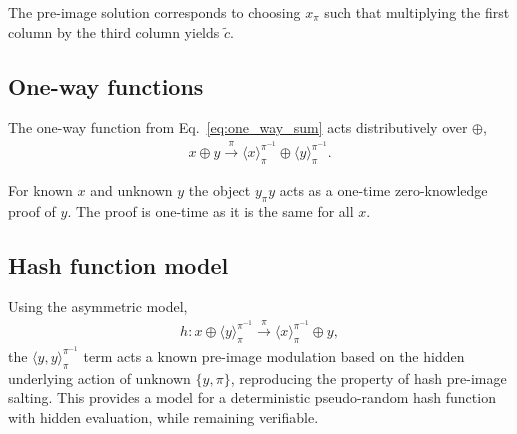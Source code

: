 \documentclass[twocolumn, aps, amsmath, amssymb, nofootinbib, superscriptaddress, longbibliography, doublefloatfix, table-of-contents, eqsecnum, rmp]{revtex4-2}
\def\braid#1#2#3#4{\langle#1,#2\rangle_{#3}^{#4}}
\def\selfbraid#1#2#3{\langle#1\rangle_{#2}^{#3}}
\def\comm#1#2#3#4{[#1,#2]_{#3}^{#4}}
\begin{document}
The pre-image solution corresponds to choosing $x_\pi$ such that multiplying the first column by the third column yields $\tilde{c}$.

\subsection{One-way functions}

The one-way function from Eq.~\eqref{eq:one_way_sum} acts distributively over $\oplus$,
\begin{align}
	x\oplus y \xrightarrow{\pi} \selfbraid{x}{\pi}{\pi^{-1}} \oplus \selfbraid{y}{\pi}{\pi^{-1}}.
\end{align}


For known $x$ and unknown $y$ the object $y_\pi y$ acts as a one-time zero-knowledge proof of $y$. The proof is one-time as it is the same for all $x$.

\subsection{Hash function model}

Using the asymmetric model,
\begin{align}
	h: x\oplus \selfbraid{y}{\pi}{\pi^{-1}} \xrightarrow{\pi} \selfbraid{x}{\pi}{\pi^{-1}} \oplus y,
\end{align}
the $\braid{y}{y}{\pi}{\pi^{-1}}$ term acts a known pre-image modulation based on the hidden underlying action of unknown $\{y,\pi\}$, reproducing the property of hash pre-image salting. This provides a model for a deterministic pseudo-random hash function with hidden evaluation, while remaining verifiable.
\end{document}
